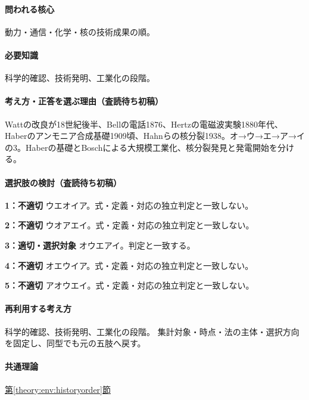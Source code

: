 \paragraph{問われる核心} 動力・通信・化学・核の技術成果の順。

\paragraph{必要知識} 科学的確認、技術発明、工業化の段階。

\paragraph{考え方・正答を選ぶ理由（査読待ち初稿）} Wattの改良が18世紀後半、Bellの電話1876、Hertzの電磁波実験1880年代、Haberのアンモニア合成基礎1909頃、Hahnらの核分裂1938。オ→ウ→エ→ア→イの3。Haberの基礎とBoschによる大規模工業化、核分裂発見と発電開始を分ける。

\paragraph{選択肢の検討（査読待ち初稿）}\mbox{}\par

\noindent\textbf{1：不適切} ウエオイア。式・定義・対応の独立判定と一致しない。\par

\noindent\textbf{2：不適切} ウオアエイ。式・定義・対応の独立判定と一致しない。\par

\noindent\textbf{3：適切・選択対象} オウエアイ。判定と一致する。\par

\noindent\textbf{4：不適切} オエウイア。式・定義・対応の独立判定と一致しない。\par

\noindent\textbf{5：不適切} アオウエイ。式・定義・対応の独立判定と一致しない。\par

\paragraph{再利用する考え方} 科学的確認、技術発明、工業化の段階。 集計対象・時点・法の主体・選択方向を固定し、同型でも元の五肢へ戻す。

\paragraph{共通理論} \hyperref[theory:env:historyorder]{第\ref*{theory:env:historyorder}節}

